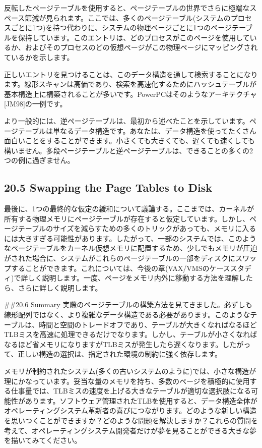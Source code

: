 反転したページテーブルを使用すると、ページテーブルの世界でさらに極端なスペース節減が見られます。ここでは、多くのページテーブル(システムのプロセスごとに1つ)を持つ代わりに、システムの物理ページごとに1つのページテーブルを保持しています。このエントリは、どのプロセスがこのページを使用しているか、およびそのプロセスのどの仮想ページがこの物理ページにマッピングされているかを示します。

正しいエントリを見つけることは、このデータ構造を通して検索することになります。線形スキャンは高価であり、検索を高速化するためにハッシュテーブルが基本構造上に構築されることが多いです。PowerPCはそのようなアーキテクチャ{[}JM98{]}の一例です。

より一般的には、逆ページテーブルは、最初から述べたことを示しています。ページテーブルは単なるデータ構造です。あなたは、データ構造を使ってたくさん面白いことをすることができます。小さくても大きくても、遅くても速くしても構いません。多段ページテーブルと逆ページテーブルは、できることの多くの2つの例に過ぎません。

\hypertarget{swapping-the-page-tables-to-disk}{%
\subsection*{20.5 Swapping the Page Tables to
Disk}\label{swapping-the-page-tables-to-disk}}

最後に、1つの最終的な仮定の緩和について議論する。ここまでは、カーネルが所有する物理メモリにページテーブルが存在すると仮定しています。しかし、ページテーブルのサイズを減らすための多くのトリックがあっても、メモリに入るには大きすぎる可能性があります。したがって、一部のシステムでは、このようなページテーブルをカーネル仮想メモリに配置するため、少しでもメモリが圧迫がされた場合に、システムがこれらのページテーブルの一部をディスクにスワップすることができます。これについては、今後の章(VAX/VMSのケーススタディ)で詳しく説明します。一度、ページをメモリ内外に移動する方法を理解したら、さらに詳しく説明します。

\#\#20.6 Summary
実際のページテーブルの構築方法を見てきました。必ずしも線形配列ではなく、より複雑なデータ構造である必要があります。このようなテーブルは、時間と空間のトレードオフであり、テーブルが大きくなればなるほどTLBミスを高速に処理できるだけでなります。しかし、テーブルが小さくなればなるほど省メモリになりますがTLBミスが発生したら遅くなります。したがって、正しい構造の選択は、指定された環境の制約に強く依存します。

メモリが制約されたシステム(多くの古いシステムのように)では、小さな構造が理にかなっています。妥当な量のメモリを持ち、多数のページを積極的に使用する仕事量では、TLBミスの速度を上げる大きなテーブルが適切な選択肢になる可能性があります。ソフトウェア管理されたTLBを使用すると、データ構造全体がオペレーティングシステム革新者の喜びにつながります。どのような新しい構造を思いつくことができますか？どのような問題を解決しますか？これらの質問を考えて、オペレーティングシステム開発者だけが夢を見ることができる大きな夢を描いてみてください。

